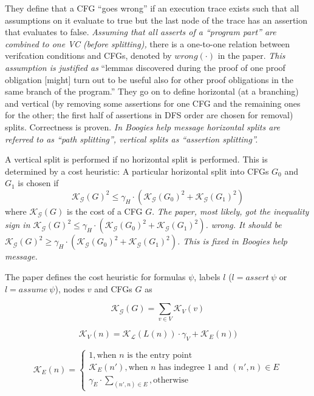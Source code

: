 \documentclass{scrartcl}
\begin{document}
They define that a CFG \enquote{goes wrong} if an execution trace exists
such that all assumptions on it evaluate to true but the last node of the trace has an assertion
that evaluates to false.
\textit{Assuming that all asserts of a \enquote{program part} are combined to one VC
(before splitting),}
there is a one-to-one relation between verifcation conditions and CFGs,
denoted by \(wrong(\cdot)\) in the paper.
\textit{This assumption is justified as }
\enquote{lemmas discovered during the proof of one proof obligation [might] turn out to be useful    
also for other proof obligations in the same branch of the program.}
They go on to define horizontal (at a branching) and vertical
(by removing some assertions for one CFG and the remaining ones for the other; 
the first half of assertions in DFS order are chosen for removal) splits.
Correctness is proven.
\textit{In Boogies help message horizontal splits are referred to as \enquote{path splitting},
    vertical splits as \enquote{assertion splitting}.}


A vertical split is performed if no horizontal split is performed.
This is determined by a cost heuristic:
A particular horizontal split into CFGs \(G_0\) and \(G_1\) is chosen if 
\[
    \mathcal{K}_\mathcal{G}(G)^2 \le \gamma_H
    \cdot (\mathcal{K}_\mathcal{G}(G_0)^2 + \mathcal{K}_\mathcal{G}(G_1)^2)
\]
where \(\mathcal{K}_\mathcal{G}(G)\) is the cost of a CFG \(G\).
\textit{The paper, most likely, got the inequality sign in
    \(\mathcal{K}_\mathcal{G}(G)^2 \le \gamma_H
    \cdot (\mathcal{K}_\mathcal{G}(G_0)^2 + \mathcal{K}_\mathcal{G}(G_1)^2)\).
    wrong. It should be
    \(\mathcal{K}_\mathcal{G}(G)^2 \ge \gamma_H
    \cdot (\mathcal{K}_\mathcal{G}(G_0)^2 + \mathcal{K}_\mathcal{G}(G_1)^2)\).
    This is fixed in Boogies help message.
}

The paper defines the cost heuristic for formulas \(\psi\),
labels \(l\) (\(l = assert\ \psi\) or \(l = assume\ \psi\)),
nodes \(v\) and CFGs \(G\) as

\[\mathcal{K}_\mathcal{G}(G) = \sum_{v\in V} \mathcal{K}_V(v)\]
        
\[\mathcal{K}_V(n) = \mathcal{K}_\mathcal{L}(L(n)) \cdot \gamma_V + \mathcal{K}_E(n))\]
    
\[\mathcal{K}_E(n) =
    \begin{cases}
        1, \text{when \(n\) is the entry point}\\
        \mathcal{K}_E(n'), \text{when \(n\) has indegree 1 and \((n', n) \in E\)}\\
        \gamma_E \cdot \sum_{(n', n) \in E}, \text{otherwise}
    \end{cases}
\]
\end{document}
